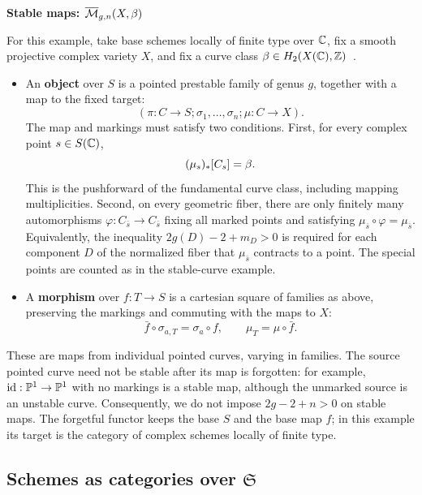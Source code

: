 \documentclass[12pt]{memoir}
\begin{document}
\begin{ptcb}
    \textbf{Stable maps: \(\overline{\mathcal{M}}_{g,n}(X,\beta)\)}\par
    For this example, take base schemes locally of finite type over \(\mathbb{C}\), fix a smooth projective complex variety \(X\), and fix a curve class
    \(\beta\in H_2(X(\mathbb{C}),\mathbb{Z})\)~\cite{notes:stablemaps-fp,notes:stablemaps-bm}.
    \begin{itemize}
        \item An \textbf{object} over \(S\) is a pointed prestable family of genus \(g\), together with a map to the fixed target:
        \[
            (\pi:C\to S;\sigma_1,\ldots,\sigma_n;\mu:C\to X).
        \]
        The map and markings must satisfy two conditions. First, for every complex point \(s\in S(\mathbb{C})\),
        \[
            (\mu_s)_*[C_s]=\beta.
        \]
        This is the pushforward of the fundamental curve class, including mapping multiplicities.
        Second, on every geometric fiber, there are only finitely many automorphisms \(\varphi:C_{\bar s}\to C_{\bar s}\) fixing all marked points and satisfying \(\mu_{\bar s}\circ\varphi=\mu_{\bar s}\).
        Equivalently, the inequality \(2g(D)-2+m_D>0\) is required for each component \(D\) of the normalized fiber that \(\mu_{\bar s}\) contracts to a point. The special points are counted as in the stable-curve example.
        \item A \textbf{morphism} over \(f:T\to S\) is a cartesian square of families as above, preserving the markings and commuting with the maps to \(X\):
        \[
            \bar f\circ\sigma_{a,T}=\sigma_a\circ f,
            \qquad \mu_T=\mu\circ\bar f.
        \]
    \end{itemize}
    These are maps from individual pointed curves, varying in families. The source pointed curve need not be stable after its map is forgotten: for example, \(\operatorname{id}:\mathbb{P}^1\to\mathbb{P}^1\) with no markings is a stable map, although the unmarked source is an unstable curve. Consequently, we do not impose \(2g-2+n>0\) on stable maps.
    The forgetful functor keeps the base \(S\) and the base map \(f\); in this example its target is the category of complex schemes locally of finite type.
\end{ptcb}

\subsection{Schemes as categories over $\mathfrak{S}$}
\label{sec:schemes-over-base}
\end{document}
